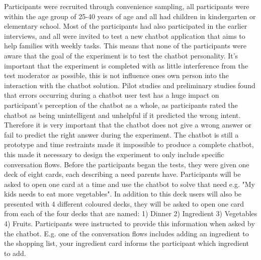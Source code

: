    Participants were recruited through convenience sampling, all participants were within the age group of 25-40 years of age and all had children in kindergarten or elementary school. Most of the participants had also participated in the earlier interviews, and all were invited to test a new chatbot application that aims to help families with weekly tasks. This means that none of the participants were aware that the goal of the experiment is to test the chatbot personality. It's important that the experiment is completed with as little interference from the test moderator as possible, this is not influence ones own person into the interaction with the chatbot solution. Pilot studies and preliminary studies found that errors occurring during a chatbot user test has a huge impact on participant's perception of the chatbot as a whole, as participants rated the chatbot as being unintelligent and unhelpful if it predicted the wrong intent. Therefore it is very important that the chatbot does not give a wrong answer or fail to predict the right answer during the experiment. The chatbot is still a prototype and time restraints made it impossible to produce a complete chatbot, this made it necessary to design the experiment to only include specific conversation flows. Before the participants began the tests, they were given one deck of eight cards, each describing a need parents have. Participants will be asked to open one card at a time and use the chatbot to solve that need e.g. "My kids needs to eat more vegetables". In addition to this deck users will also be presented with 4 different coloured decks, they will be asked to open one card from each of the four decks that are named: 1) Dinner 2) Ingredient 3) Vegetables 4) Fruits. Participants were instructed to provide this information when asked by the chatbot. E.g. one of the conversation flows includes adding an ingredient to the shopping list, your ingredient card informs the participant which ingredient to add.
   

